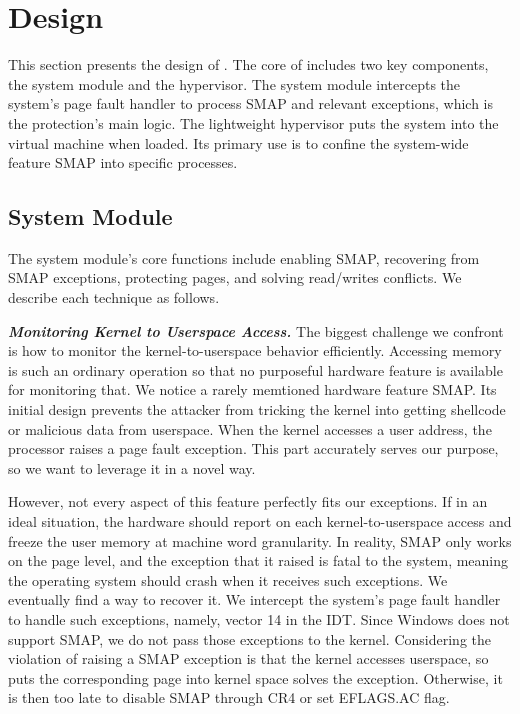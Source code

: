 
\section{\name Design}
\label{sec:ktoctou-design}

This section presents the design of \name.  The core of \name includes two key components, the system module and the hypervisor. The system module intercepts the system's page fault handler to process SMAP and relevant exceptions, which is the protection's main logic.  The lightweight hypervisor puts the system into the virtual machine when loaded. Its primary use is to confine the system-wide feature SMAP into specific processes.

\subsection{System Module}

The system module's core functions include enabling SMAP, recovering from SMAP exceptions, protecting pages, and solving read/writes conflicts. We describe each technique as follows.

\textbf{\textit{Monitoring Kernel to Userspace Access. }} The biggest challenge we confront is how to monitor the kernel-to-userspace behavior efficiently. Accessing memory is such an ordinary operation so that no purposeful hardware feature is available for monitoring that.  We notice a rarely memtioned hardware feature SMAP. Its initial design prevents the attacker from tricking the kernel into getting shellcode or malicious data from userspace. When the kernel accesses a user address, the processor raises a page fault exception. This part accurately serves our purpose, so we want to leverage it in a novel way. 

However, not every aspect of this feature perfectly fits our exceptions. If in an ideal situation, the hardware should report on each kernel-to-userspace access and freeze the user memory at machine word granularity. In reality, SMAP only works on the page level, and the exception that it raised is fatal to the system, meaning the operating system should crash when it receives such exceptions.  We eventually find a way to recover it. We intercept the system's page fault handler to handle such exceptions, namely, vector 14 in the IDT. Since Windows does not support SMAP, we do not pass those exceptions to the kernel. Considering the violation of raising a SMAP exception is that the kernel accesses userspace, so puts the corresponding page into kernel space solves the exception. Otherwise, it is then too late to disable SMAP through CR4 or set EFLAGS.AC flag.



